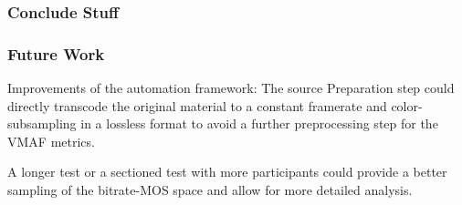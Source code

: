 \subsubsection{Conclude Stuff}

\subsubsection{Future Work}
Improvements of the automation framework: The source Preparation step could directly transcode the original material to a constant framerate and color-subsampling in a lossless format to avoid a further preprocessing step for the VMAF metrics.

A longer test or a sectioned test with more participants could provide a better sampling of the bitrate-MOS space and allow for more detailed analysis.